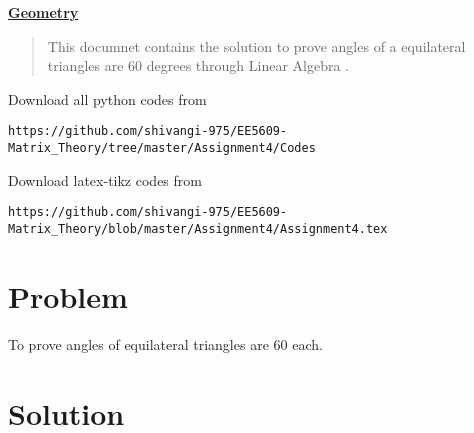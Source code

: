 \documentclass[journal,12pt,twocolumn]{IEEEtran}
\begin{document}
%
\vspace{2ex}
\begin{center}
{\underline{\Large \bf Geometry}}
\end{center}
\begin{abstract}
This documnet contains the solution to prove angles of a equilateral triangles are 60 degrees through Linear Algebra .
\end{abstract}
Download all python codes from
%
\begin{lstlisting}
https://github.com/shivangi-975/EE5609-Matrix_Theory/tree/master/Assignment4/Codes
\end{lstlisting}
%
Download latex-tikz codes from
%
\begin{lstlisting}
https://github.com/shivangi-975/EE5609-Matrix_Theory/blob/master/Assignment4/Assignment4.tex
\end{lstlisting}
%
\section{Problem}
To prove angles of equilateral triangles are   60 \degree each.
%
%
\section{Solution}
\end{document}

